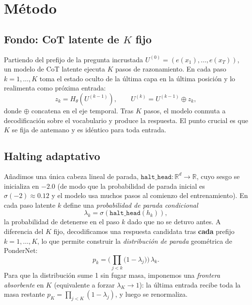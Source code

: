 \documentclass[11pt]{article}
\begin{document}
\section{Método}
\label{sec:metodo}

\subsection{Fondo: CoT latente de $K$ fijo}

Partiendo del prefijo de la pregunta incrustada $U^{(0)} = (e(x_1),\dots,e(x_T))$, un modelo de CoT latente ejecuta $K$ pasos de razonamiento. En cada paso $k = 1,\dots,K$ toma el estado oculto de la última capa en la última posición y lo realimenta como próxima entrada:
\begin{equation}
  z_k = H_\theta\!\left(U^{(k-1)}\right), \qquad
  U^{(k)} = U^{(k-1)} \oplus z_k,
  \label{eq:latentloop}
\end{equation}
donde $\oplus$ concatena en el eje temporal. Tras $K$ pasos, el modelo conmuta a decodificación sobre el vocabulario y produce la respuesta. El punto crucial es que $K$ se fija de antemano y es idéntico para toda entrada.

\subsection{Halting adaptativo}
\label{sec:halting}

Añadimos una única cabeza lineal de parada, $\texttt{halt\_head}: \mathbb{R}^d \rightarrow \mathbb{R}$, cuyo sesgo se inicializa en $-2.0$ (de modo que la probabilidad de parada inicial es $\sigma(-2)\approx 0.12$ y el modelo usa muchos pasos al comienzo del entrenamiento). En cada paso latente $k$ define una \emph{probabilidad de parada condicional}
\begin{equation}
  \lambda_k = \sigma\!\left(\texttt{halt\_head}(h_k)\right),
\end{equation}
la probabilidad de detenerse en el paso $k$ dado que no se detuvo antes. A diferencia del $K$ fijo, decodificamos una respuesta candidata tras \textbf{cada} prefijo $k = 1,\dots,K$, lo que permite construir la \emph{distribución de parada} geométrica de PonderNet:
\begin{equation}
  p_k = \Bigg(\prod_{j<k}\big(1 - \lambda_j\big)\Bigg)\,\lambda_k .
  \label{eq:halting}
\end{equation}
Para que la distribución sume 1 sin fugar masa, imponemos una \emph{frontera absorbente} en $K$ (equivalente a forzar $\lambda_K \rightarrow 1$): la última entrada recibe toda la masa restante $p_K = \prod_{j<K}(1-\lambda_j)$, y luego se renormaliza.
\end{document}
